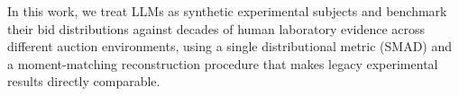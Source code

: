 \bigskip


In this work, we treat LLMs  as synthetic experimental subjects and benchmark their bid distributions against decades of human laboratory evidence across different  auction environments, using a single distributional metric (SMAD) and a moment-matching reconstruction procedure that makes legacy experimental results directly comparable.
